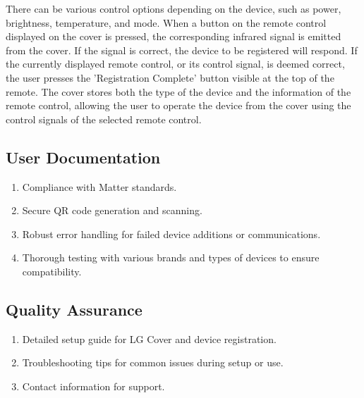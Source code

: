 \documentclass[conference]{IEEEtran}
\begin{document}
\begin{enumerate}[label=\arabic*.]
\begin{enumerate}[label=\alph*.]
\begin{itemize}
There can be various control options depending on the device, such as power, brightness, temperature, and mode. When a button on the remote control displayed on the cover is pressed, the corresponding infrared signal is emitted from the cover. If the signal is correct, the device to be registered will respond. If the currently displayed remote control, or its control signal, is deemed correct, the user presses the 'Registration Complete' button visible at the top of the remote. The cover stores both the type of the device and the information of the remote control, allowing the user to operate the device from the cover using the control signals of the selected remote control.\\
\end{itemize}
\end{enumerate}
\end{enumerate}



\subsection{\large{User Documentation}}
\begin{enumerate}[label=\arabic*.]
\item Compliance with Matter standards.\\
\item Secure QR code generation and scanning.\\
\item Robust error handling for failed device additions or communications.\\
\item Thorough testing with various brands and types of devices to ensure compatibility.\\
\end{enumerate}

\subsection{\large{Quality Assurance}}
\begin{enumerate}[label=\arabic*.]
\item Detailed setup guide for LG Cover and device registration.\\
\item Troubleshooting tips for common issues during setup or use.\\
\item Contact information for support.\\
\end{enumerate}
\end{document}
